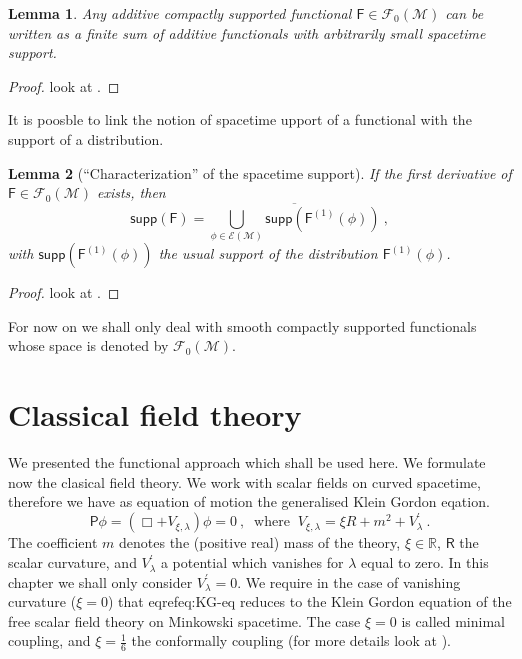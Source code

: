 \documentclass[10pt]{book}
\newcommand{\supp}{\mathsf{supp}}
\newcommand{\Ecal}{\mathcal{E}}
\newcommand{\Fcal}{\mathcal{F}}
\newcommand{\Mcal}{\mathcal{M}}
\newcommand{\Rbb}{\mathbb{R}}
\newcommand{\Fsf}{\mathsf{F}}
\newcommand{\Psf}{\mathsf{P}}
\newcommand{\Rsf}{\mathsf{R}}
\theoremstyle{break}
\newtheorem{lemma}{Lemma}
\begin{document}
\begin{lemma}
Any additive compactly supported  functional $\Fsf \in \Fcal_0(\Mcal)$ can be written as a finite sum of additive functionals with arbitrarily small spacetime support.
\end{lemma}


\begin{proof}
look at \cite[lemma 2.3.5]{brunetti_algebraic_2012}. 
\end{proof}


It is poosble to link the notion of spacetime upport of a functional with the support of a distribution.


\begin{lemma}[``Characterization'' of the spacetime support]
If the first derivative of $\Fsf\in\Fcal_0(\Mcal)$ exists, then
%
\begin{equation*}
\supp\left(\Fsf\right) = \overline{\bigcup_{\phi\in\Ecal(\Mcal)} \supp\left(\Fsf^{(1)}(\phi)\right)} \ ,
\end{equation*}
%
with $\supp\left(\Fsf^{(1)}(\phi)\right)$ the usual support of the distribution $\Fsf^{(1)}(\phi)$.
\end{lemma}


\begin{proof}
look at \cite[lemma 2.3.5]{brunetti_algebraic_2012}. 
\end{proof}


For now on we shall only deal with smooth compactly supported functionals whose space is denoted by $\Fcal_0(\Mcal)$.


\section{Classical field theory}


We presented the functional approach which shall be used here. We formulate now the clasical field theory. We work with scalar fields on curved spacetime, therefore we have as equation of motion the generalised Klein Gordon eqation.%
%
\begin{equation} 
\Psf \phi = \left( \Box + V_{\xi,\lambda} \right) \phi = 0 \ , \
\mbox{ where } \ V_{\xi,\lambda} = \xi R + m^2 + V^\prime_\lambda \ . 
\label{eq:KG-eq}
\end{equation}
%
The coefficient $m$ denotes the (positive real) mass of the theory, $\xi \in \Rbb$, $\Rsf$ the scalar curvature, and $V^\prime_\lambda$ a potential which vanishes for $\lambda$ equal to zero. In this chapter we shall only consider $V^\prime_\lambda=0$. We require in the case of vanishing curvature ($\xi=0$) that eqref{eq:KG-eq}
reduces to the Klein Gordon equation of the free scalar field theory on Minkowski spacetime. The case $\xi=0$ is called minimal coupling, and $\xi=\frac16$ the conformally coupling (for more details look at \cite{waldGR}).
\end{document}
